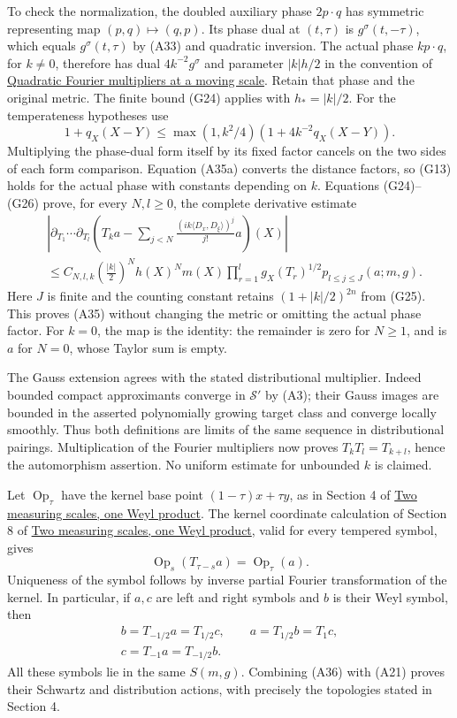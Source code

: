 \documentclass[
  11pt,
]{article}
\begin{document}
To check the normalization, the doubled auxiliary phase \(2p\cdot q\)
has symmetric representing map \((p,q)\mapsto(q,p)\). Its phase dual at
\((t,\tau)\) is \(g^\sigma(t,-\tau)\), which equals \(g^\sigma(t,\tau)\)
by (A33) and quadratic inversion. The actual phase \(k p\cdot q\), for
\(k\ne0\), therefore has dual \(4k^{-2}g^\sigma\) and parameter
\(|k|h/2\) in the convention of
\href{gauss-transform-estimates.pdf}{Quadratic Fourier multipliers at a
moving scale}. Retain that phase and the original metric. The finite
bound (G24) applies with \(h_*=|k|/2\). For the temperateness hypotheses
use \[
 1+q_X(X-Y)\le\max(1,k^2/4)
                  (1+4k^{-2}q_X(X-Y)).
 \tag{A35a}
\] Multiplying the phase-dual form itself by its fixed factor cancels on
the two sides of each form comparison. Equation (A35a) converts the
distance factors, so (G13) holds for the actual phase with constants
depending on \(k\). Equations (G24)--(G26) prove, for every \(N,l\ge0\),
the complete derivative estimate \[
 \begin{aligned}
 & \left|\partial_{T_1}\cdots\partial_{T_l}
 \left(T_ka-\sum_{j<N}\frac{(ik\langle D_x,D_\xi\rangle)^j}{j!}a\right)(X)\right|
 \\ &\le C_{N,l,k}\left(\frac{|k|}{2}\right)^N h(X)^N m(X)
       \prod_{r=1}^l g_X(T_r)^{1/2}
       p_{l\le j\le J}(a;m,g).
 \end{aligned}
 \tag{A35b}
\] Here \(J\) is finite and the counting constant retains
\((1+|k|/2)^{2n}\) from (G25). This proves (A35) without changing the
metric or omitting the actual phase factor. For \(k=0\), the map is the
identity: the remainder is zero for \(N\ge1\), and is \(a\) for \(N=0\),
whose Taylor sum is empty.

The Gauss extension agrees with the stated distributional multiplier.
Indeed bounded compact approximants converge in \(\mathcal S'\) by (A3);
their Gauss images are bounded in the asserted polynomially growing
target class and converge locally smoothly. Thus both definitions are
limits of the same sequence in distributional pairings. Multiplication
of the Fourier multipliers now proves \(T_kT_l=T_{k+l}\), hence the
automorphism assertion. No uniform estimate for unbounded \(k\) is
claimed.

Let \(\operatorname{Op}_\tau\) have the kernel base point
\((1-\tau)x+\tau y\), as in Section 4 of
\href{weyl-metric-products.pdf}{Two measuring scales, one Weyl product}.
The kernel coordinate calculation of Section 8 of
\href{weyl-metric-products.pdf}{Two measuring scales, one Weyl product},
valid for every tempered symbol, gives \[
\operatorname{Op}_s(T_{\tau-s}a)=\operatorname{Op}_\tau(a).
\tag{A36}
\] Uniqueness of the symbol follows by inverse partial Fourier
transformation of the kernel. In particular, if \(a,c\) are left and
right symbols and \(b\) is their Weyl symbol, then \[
\begin{gathered}
b=T_{-1/2}a=T_{1/2}c,\qquad
a=T_{1/2}b=T_1c,\\
c=T_{-1}a=T_{-1/2}b.
\end{gathered}
\tag{A37}
\] All these symbols lie in the same \(S(m,g)\). Combining (A36) with
(A21) proves their Schwartz and distribution actions, with precisely the
topologies stated in Section 4.
\end{document}
